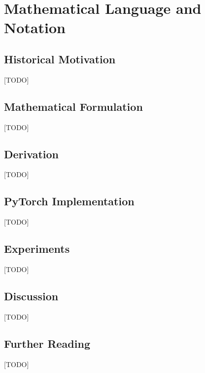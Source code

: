 
\chapter{Mathematical Language and Notation}
\label{ch:00_mathematical_language}


\section{Historical Motivation}
[TODO]

\section{Mathematical Formulation}
[TODO]

\section{Derivation}
[TODO]

\section{PyTorch Implementation}
[TODO]

\section{Experiments}
[TODO]

\section{Discussion}
[TODO]

\section{Further Reading}
[TODO]

